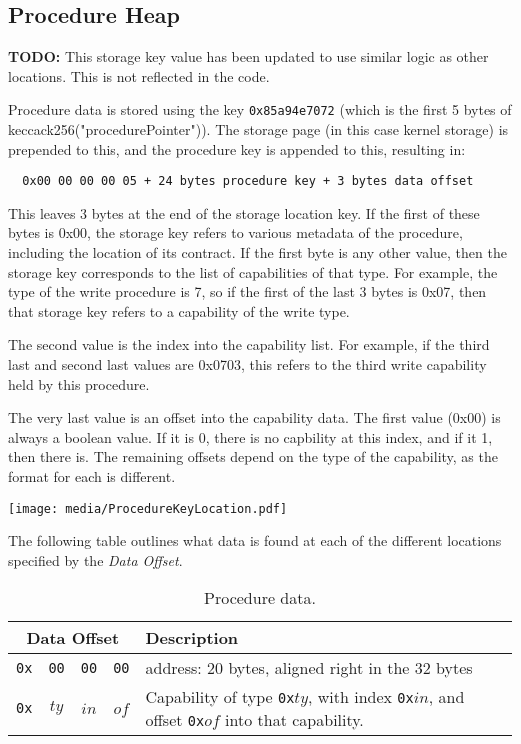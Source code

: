 \documentclass[english,a4paper]{article}
\begin{document}
\subsection{Procedure Heap}\label{procedure-heap}

\textbf{TODO:} This storage key value has been updated to use similar logic as
other locations. This is not reflected in the code.

Procedure data is stored using the key \texttt{0x85a94e7072} (which is the first
5 bytes of keccack256("procedurePointer")). The storage page (in this case
kernel storage) is prepended to this, and the procedure key is appended to this,
resulting in:

\begin{verbatim}
  0x00 00 00 00 05 + 24 bytes procedure key + 3 bytes data offset
\end{verbatim}

This leaves 3 bytes at the end of the storage location key. If the first of
these bytes is 0x00, the storage key refers to various metadata of the
procedure, including the location of its contract. If the first byte is any
other value, then the storage key corresponds to the list of capabilities of
that type. For example, the type of the write procedure is 7, so if the first of
the last 3 bytes is 0x07, then that storage key refers to a capability of the
write type.

The second value is the index into the capability list. For example, if the
third last and second last values are 0x0703, this refers to the third write
capability held by this procedure.

The very last value is an offset into the capability data. The first value
(0x00) is always a boolean value. If it is 0, there is no capbility at this
index, and if it 1, then there is. The remaining offsets depend on the type of
the capability, as the format for each is different.

\texttt{[image: media/ProcedureKeyLocation.pdf]}

The following table outlines what data is found at each of the different
locations specified by the \emph{Data Offset}.

\begin{table}[H]
  \caption{Procedure data.}
  \centering{}%
  \begin{tabularx}{\textwidth}{c | c | c | c | X }
    \hline
    \multicolumn{4}{c|}{Data Offset} & Description \\
    \hline
    \hline
    \texttt{0x} & \texttt{00} & \texttt{00} & \texttt{00} & address: 20 bytes, aligned right in the 32 bytes
      \\
    \texttt{0x} & \texttt{$ty$} & \texttt{$in$} & \texttt{$of$} & Capability of type
        \texttt{0x$ty$}, with index
        \texttt{0x$in$}, and offset \texttt{0x$of$} into that capability.
      \\
    \hline
  \end{tabularx}
\end{table}
\end{document}
